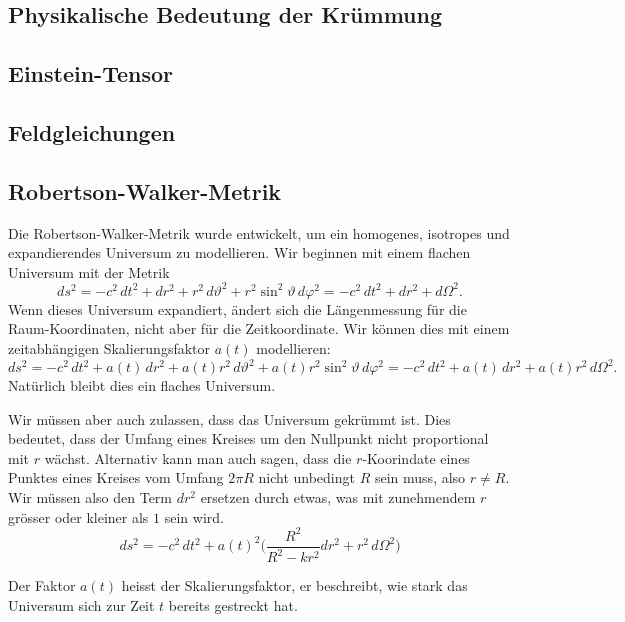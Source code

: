 \subsection{Physikalische Bedeutung der Krümmung}

\subsection{Einstein-Tensor}

\subsection{Feldgleichungen}



\subsection{Robertson-Walker-Metrik}
Die Robertson-Walker-Metrik wurde entwickelt, um ein homogenes,
isotropes und expandierendes Universum zu modellieren.
Wir beginnen mit einem flachen Universum mit der
Metrik
\[
ds^2
=
-c^2\,dt^2 + dr^2 + r^2\,d\vartheta^2 + r^2\sin^2\vartheta \,d\varphi^2
=
-c^2\,dt^2 + dr^2 + d\Omega^2.
\]
Wenn dieses Universum expandiert, ändert sich die Längenmessung für die
Raum-Koordinaten, nicht aber für die Zeitkoordinate.
Wir können dies mit einem zeitabhängigen Skalierungsfaktor $a(t)$ 
modellieren:
\[
ds^2
=
-c^2\,dt^2 + a(t)\,dr^2 + a(t)r^2\,d\vartheta^2 + a(t)r^2 \sin^2\vartheta\,d\varphi^2
=
-c^2\,dt^2 + a(t)\,dr^2 + a(t)r^2\,d\Omega^2.
\]
Natürlich bleibt dies ein flaches Universum.

Wir müssen aber auch zulassen, dass das Universum gekrümmt ist.
Dies bedeutet, dass der Umfang eines Kreises um den Nullpunkt
nicht proportional mit $r$ wächst.
Alternativ kann man auch sagen, dass die $r$-Koorindate eines Punktes 
eines Kreises vom Umfang $2\pi R$ nicht unbedingt $R$ sein muss, also
$r \ne R$.
Wir müssen also den Term $dr^2$ ersetzen durch etwas, was mit zunehmendem
$r$ grösser oder kleiner als $1$ sein wird.
\[
ds^2
=
-c^2\,dt^2
+ a(t)^2 \biggl(
\frac{R^2}{R^2-kr^2} dr^2
+
r^2\, d\Omega^2
\biggr)
\]

Der Faktor $a(t)$ heisst der Skalierungsfaktor, er beschreibt, wie stark
das Universum sich zur Zeit $t$ bereits gestreckt hat.

